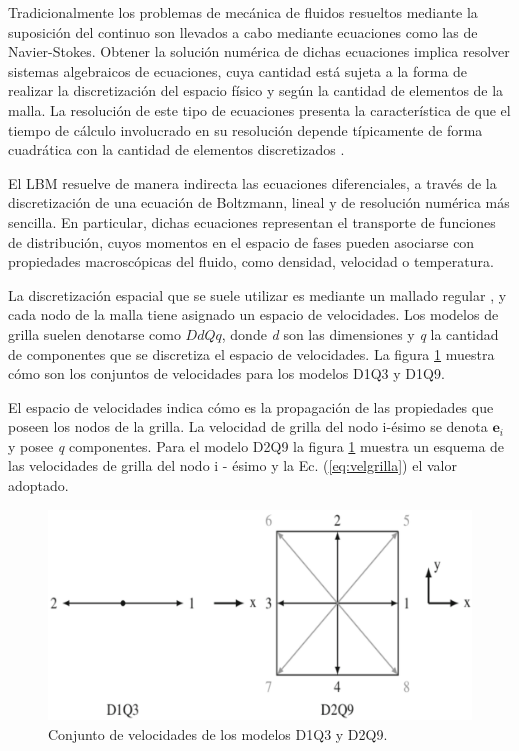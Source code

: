 Tradicionalmente los problemas de mecánica de fluidos resueltos mediante la suposición del continuo son llevados a cabo mediante  ecuaciones como las de Navier-Stokes. Obtener la solución numérica de dichas ecuaciones implica resolver sistemas  algebraicos de ecuaciones, cuya cantidad está sujeta a la forma de realizar la discretización del espacio físico y según la cantidad de elementos de la malla. La resolución de este tipo de ecuaciones presenta la característica de que el tiempo de cálculo involucrado en su resolución depende típicamente de forma cuadrática con la cantidad de elementos discretizados \cite{kelley1995iterative}.

El LBM resuelve de manera indirecta las ecuaciones diferenciales, a través de la discretización de una ecuación de Boltzmann, lineal y de resolución numérica más sencilla. En particular, dichas ecuaciones representan el transporte de funciones de distribución, cuyos momentos en el espacio de fases pueden asociarse con propiedades macroscópicas del fluido, como densidad, velocidad o temperatura.

La discretización espacial que se suele utilizar es mediante un mallado regular \cite{guo2013lattice}, y  cada nodo de la malla tiene asignado un espacio de velocidades. Los modelos de grilla suelen denotarse como $DdQq$, donde \textit{d} son las dimensiones y \textit{q} la cantidad de componentes que se discretiza el espacio de velocidades. La figura \ref{fig:D1Q3_D2Q9} muestra cómo son los conjuntos de velocidades para los modelos D1Q3 y D1Q9.

El espacio de velocidades indica cómo es la propagación de las propiedades que poseen los nodos de la grilla. La velocidad de grilla del nodo i-ésimo se denota $\mathbf{e}_{i}$ y posee \textit{q} componentes. Para el modelo D2Q9 la figura \ref{fig:D1Q3_D2Q9} muestra un esquema de las velocidades de grilla del nodo i - ésimo y la Ec. (\ref{eq:velgrilla}) el valor adoptado. 

\begin{figure}[h!]
	\centering
	\includegraphics[width=.8\textwidth]{figs/cap1/D1Q3_D2Q9}
	\caption{Conjunto de velocidades de los modelos D1Q3 y D2Q9. \cite{kruger2017lattice}}
	\label{fig:D1Q3_D2Q9}	
\end{figure}


